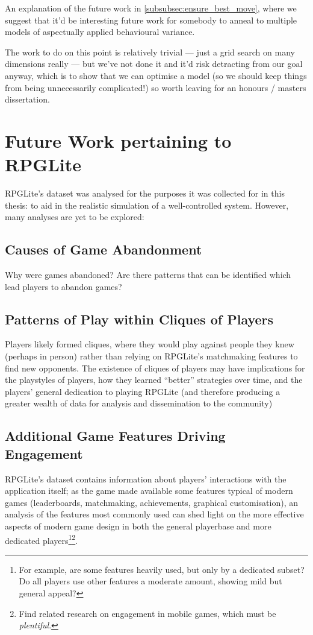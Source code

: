 An explanation of the future work in \cref{subsubsec:ensure_best_move}, where we
suggest that it'd be interesting future work for somebody to anneal to multiple
models of aspectually applied behavioural variance. 

The work to do on this point is relatively trivial --- just a grid search on
many dimensions really --- but we've not done it and it'd risk detracting from
our goal anyway, which is to show that we can optimise a model (so we should
keep things from being unnecessarily complicated!) so worth leaving for an
honours / masters dissertation.




\section{Future Work pertaining to RPGLite}\label{sec:future_work_rpglite}
RPGLite's dataset was analysed for the purposes it was collected for in this
thesis: to aid in the realistic simulation of a well-controlled \sociotechnical
system. However, many analyses are yet to be explored:

\subsection{Causes of Game Abandonment}
Why were games abandoned? Are there patterns that can be identified
which lead players to abandon games?
    
\subsection{Patterns of Play within Cliques of Players}
Players likely formed cliques, where they would play against people they knew
(perhaps in person) rather than relying on RPGLite's matchmaking features to
find new opponents. The existence of cliques of players may have implications
for the playstyles of players, how they learned ``better'' strategies over time,
and the players' general dedication to playing RPGLite (and therefore producing
a greater wealth of data for analysis and dissemination to the community)
    
\subsection{Additional Game Features Driving Engagement}
RPGLite's dataset contains information about players' interactions with the
application itself; as the game made available some features typical of modern
games (leaderboards, matchmaking, achievements, graphical customisation), an
analysis of the features most commonly used can shed light on the more effective
aspects of modern game design in both the general playerbase and more dedicated
players\footnote{For example, are some features heavily used, but only by a
dedicated subset? Do all players use other features a moderate amount, showing
mild but general appeal?}\footnote{Find related research on engagement in mobile
games, which must be \emph{plentiful}.}.
    

